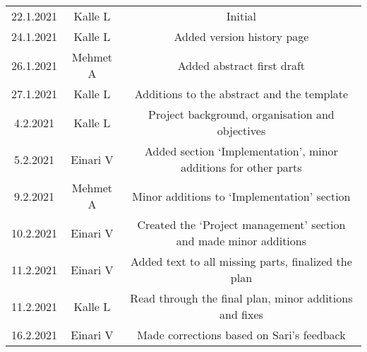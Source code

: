 \begin{center}
	\begin{tabular}{ c c c }
		22.1.2021 & Kalle L & Initial \\ 
		24.1.2021 & Kalle L & Added version history page \\
		26.1.2021 & Mehmet A & Added abstract first draft \\ 
		27.1.2021 & Kalle L & Additions to the abstract and the template \\
		4.2.2021 & Kalle L & Project background, organisation and objectives \\ 
		5.2.2021 & Einari V & Added section `Implementation', minor additions for other parts \\
		9.2.2021 & Mehmet A & Minor additions to `Implementation' section \\
		10.2.2021 & Einari V & Created the `Project management' section and made minor additions \\
		11.2.2021 & Einari V & Added text to all missing parts, finalized the plan \\
		11.2.2021 & Kalle L & Read through the final plan, minor additions and fixes \\
		16.2.2021 & Einari V & Made corrections based on Sari's feedback
	\end{tabular}
\end{center}